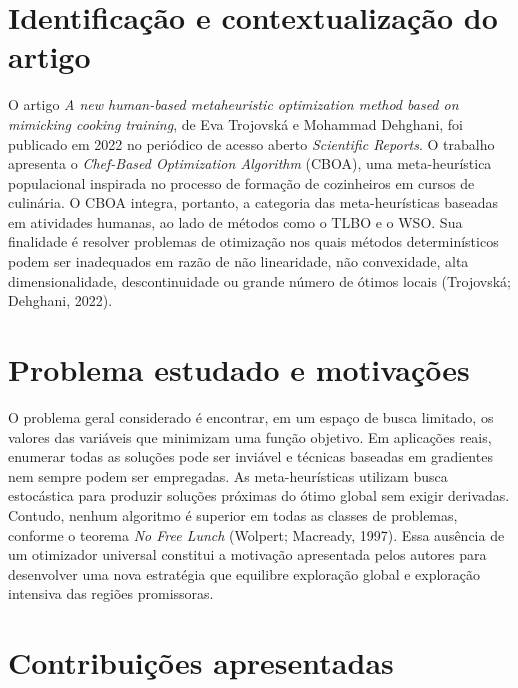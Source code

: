 \documentclass[12pt,a4paper]{article}
\begin{document}
\tableofcontents
\clearpage

\hypersetup{pageanchor=true}
\setcounter{page}{3}

\section{Identificação e contextualização do artigo}

O artigo \textit{A new human-based metaheuristic optimization method based on
mimicking cooking training}, de Eva Trojovská e Mohammad Dehghani, foi
publicado em 2022 no periódico de acesso aberto \textit{Scientific Reports}.
O trabalho apresenta o \textit{Chef-Based Optimization Algorithm} (CBOA), uma
meta-heurística populacional inspirada no processo de formação de cozinheiros
em cursos de culinária. O CBOA integra, portanto, a categoria das
meta-heurísticas baseadas em atividades humanas, ao lado de métodos como o
TLBO e o WSO. Sua finalidade é resolver problemas de otimização nos quais
métodos determinísticos podem ser inadequados em razão de não linearidade,
não convexidade, alta dimensionalidade, descontinuidade ou grande número de
ótimos locais (Trojovská; Dehghani, 2022).

\section{Problema estudado e motivações}

O problema geral considerado é encontrar, em um espaço de busca limitado, os
valores das variáveis que minimizam uma função objetivo. Em aplicações reais,
enumerar todas as soluções pode ser inviável e técnicas baseadas em gradientes
nem sempre podem ser empregadas. As meta-heurísticas utilizam busca estocástica
para produzir soluções próximas do ótimo global sem exigir derivadas. Contudo,
nenhum algoritmo é superior em todas as classes de problemas, conforme o
teorema \textit{No Free Lunch} (Wolpert; Macready, 1997). Essa ausência de um
otimizador universal constitui a motivação apresentada pelos autores para
desenvolver uma nova estratégia que equilibre exploração global e exploração
intensiva das regiões promissoras.

\section{Contribuições apresentadas}
\end{document}
